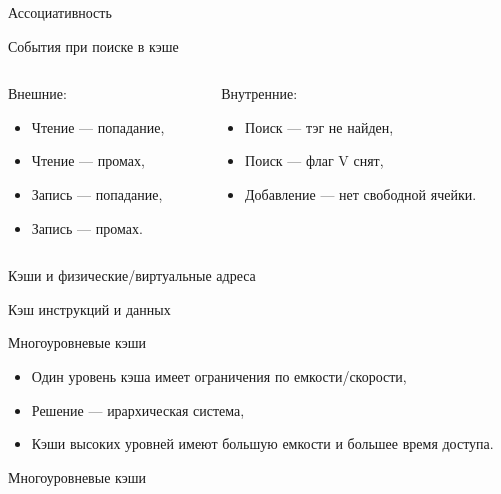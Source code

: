 \begin{frame}{Ассоциативность}
\todo
\end{frame}

\begin{frame}{События при поиске в кэше}
\begin{columns}[t]
    \begin{column}[T]{0.5\textwidth}
    Внешние:
    \begin{itemize}
        \item Чтение --- попадание,
        \item Чтение --- промах,
        \item Запись --- попадание,
        \item Запись --- промах.
    \end{itemize}
    \end{column}
    \begin{column}[T]{0.5\textwidth}
    Внутренние:
    \begin{itemize}
        \item Поиск --- тэг не найден,
        \item Поиск --- флаг V снят,
        \item Добавление --- нет свободной ячейки.
    \end{itemize}
    \end{column}
\end{columns}
\end{frame}

\begin{frame}{Кэши и физические/виртуальные адреса}
\end{frame}

\begin{frame}{Кэш инструкций и данных}
\end{frame}

\begin{frame}{Многоуровневые кэши}
\begin{itemize}
    \item Один уровень кэша имеет ограничения по емкости/скорости,
    \item Решение --- ирархическая система,
    \item Кэши высоких уровней имеют большую емкости и большее время доступа.
\end{itemize}
\end{frame}

\begin{frame}{Многоуровневые кэши}
\centering
{}
\end{frame}

